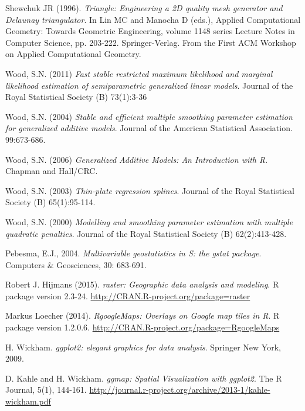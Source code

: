 \documentclass[a4paper,11pt,twoside,openright]{book}							%
\begin{document}
\begin{thebibliography}{99}
Shewchuk JR (1996). \emph{Triangle: Engineering a 2D quality mesh generator and Delaunay triangulator}. In Lin MC and Manocha D (eds.), Applied Computational Geometry: Towards Geometric Engineering, volume 1148 series Lecture Notes in Computer Science, pp. 203-222. Springer-Verlag. From the First ACM Workshop on Applied Computational Geometry.

Wood, S.N. (2011) \emph{Fast stable restricted maximum likelihood and marginal likelihood estimation of semiparametric generalized linear models}. Journal of the Royal Statistical Society (B) 73(1):3-36

Wood, S.N. (2004) \emph{Stable and efficient multiple smoothing parameter estimation for generalized additive models}. Journal of the American Statistical Association. 99:673-686.

Wood, S.N. (2006) \emph{Generalized Additive Models: An Introduction with R}. Chapman and Hall/CRC.

Wood, S.N. (2003) \emph{Thin-plate regression splines}. Journal of the Royal Statistical Society (B) 65(1):95-114.
  
Wood, S.N. (2000) \emph{Modelling and smoothing parameter estimation with multiple quadratic penalties}. Journal of the Royal Statistical Society (B) 62(2):413-428.

Pebesma, E.J., 2004. \emph{Multivariable geostatistics in S: the gstat package}. Computers \& Geosciences, 30: 683-691.

Robert J. Hijmans (2015). \emph{raster: Geographic data analysis and modeling}. R package version 2.3-24. \href{http://CRAN.R-project.org/package=raster}{http://CRAN.R-project.org/package=raster}

Markus Loecher (2014). \emph{RgoogleMaps: Overlays on Google map tiles in R}. R package version 1.2.0.6. \href{http://CRAN.R-project.org/package=RgoogleMaps}{http://CRAN.R-project.org/package=RgoogleMaps}

H. Wickham. \emph{ggplot2: elegant graphics for data analysis}. Springer New York, 2009.

D. Kahle and H. Wickham. \emph{ggmap: Spatial Visualization with ggplot2}. The R Journal, 5(1), 144-161. \href{http://journal.r-project.org/archive/2013-1/kahle-wickham.pdf}{http://journal.r-project.org/archive/2013-1/kahle-wickham.pdf}


\end{thebibliography}
\end{document}
